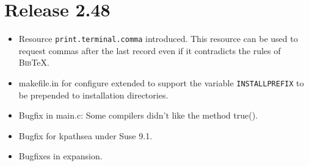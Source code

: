 \documentclass[11pt,a4paper]{scrartcl}
\newcommand\rsc[1]{\texttt{#1}}
\newcommand\File[1]{\textsf{#1}}
\newcommand\BibTeX{\textsc{Bib}\TeX}
\newenvironment{Release}[2]{\section*{Release #1}\begin{itemize}}{\end{itemize}}
\newenvironment{Fix}[1]{\item }{}
\newenvironment{New}[1]{\item }{}
\begin{document}
 \begin{Release}{2.48}{August 6, 2004}
  \begin{New}{gene}
    Resource \rsc{print.terminal.comma} introduced. This resource can
    be used to request commas after the last record even if it contradicts the
    rules of \BibTeX.
  \end{New}
  \begin{New}{gene}
    \File{makefile.in} for configure extended to support the variable
    \texttt{INSTALLPREFIX} to be prepended to installation
    directories.
  \end{New}
  \begin{Fix}{gene}
    Bugfix in \File{main.c}: Some compilers didn't like the method true().
  \end{Fix}
  \begin{Fix}{gene}
    Bugfix for kpathsea under Suse 9.1.
  \end{Fix}
  \begin{Fix}{gene}
    Bugfixes in expansion.
  \end{Fix}


\end{Release}
\end{document}
